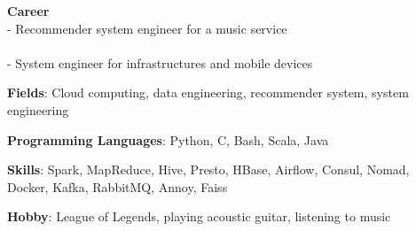 

\begin{cventries}
    \cvsimpleentry
        { %
            \begin{cvitems}
                \item{
                    {\bf Career} \\
                    - Recommender system engineer for a music service \\
                     \\
                    - System engineer for infrastructures and mobile devices \\
                     \nn
                }
                \item{
                    {\bf Fields}: Cloud computing, data engineering, recommender system, system engineering \nn
                }
                \item{
                    {\bf Programming Languages}: Python, C, Bash, Scala, Java \nn
                }
                \item{
                    {\bf Skills}: Spark, MapReduce, Hive, Presto, HBase, Airflow, Consul, Nomad, Docker, Kafka, RabbitMQ, Annoy, Faiss \nn
                }
                \item{
                    {\bf Hobby}: League of Legends, playing acoustic guitar, listening to music
                }
            \end{cvitems}
        }
\end{cventries}
